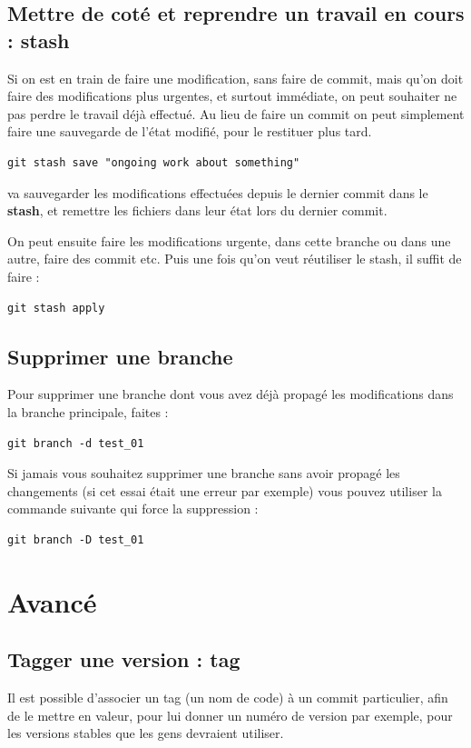 \documentclass[a4paper,twoside]{article}
\begin{document}
\subsection{Mettre de coté et reprendre un travail en cours : stash}
Si on est en train de faire une modification, sans faire de commit, mais qu'on doit faire des modifications plus urgentes, et surtout immédiate, on peut souhaiter ne pas perdre le travail déjà effectué. Au lieu de faire un commit on peut simplement faire une sauvegarde de l'état modifié, pour le restituer plus tard.

\begin{verbatim}
git stash save "ongoing work about something"
\end{verbatim}
va sauvegarder les modifications effectuées depuis le dernier commit dans le \textbf{stash}, et remettre les fichiers dans leur état lors du dernier commit. 

On peut ensuite faire les modifications urgente, dans cette branche ou dans une autre, faire des commit etc. Puis une fois qu'on veut réutiliser le stash, il suffit de faire : 
\begin{verbatim}
git stash apply
\end{verbatim}



\subsection{Supprimer une branche}
Pour supprimer une branche dont vous avez déjà propagé les modifications dans la branche principale, faites : 
\begin{verbatim}
git branch -d test_01
\end{verbatim}

Si jamais vous souhaitez supprimer une branche sans avoir propagé les changements (si cet essai était une erreur par exemple) vous pouvez utiliser la commande suivante qui force la suppression : 
\begin{verbatim}
git branch -D test_01
\end{verbatim}

\section{Avancé}
\subsection{Tagger une version : tag}
Il est possible d'associer un tag (un nom de code) à un commit particulier, afin de le mettre en valeur, pour lui donner un numéro de version par exemple, pour les versions stables que les gens devraient utiliser.
\end{document}
